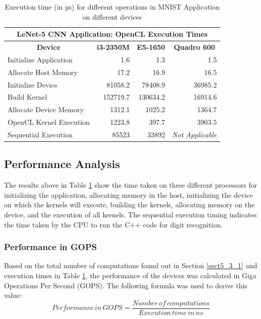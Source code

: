 \begin{table}[h!]
\centering
 \caption{Execution time (in µs) for different operations in MNIST Application on different devices}
 \vspace{3mm}
 \renewcommand\arraystretch{1.6}
 \begin{tabular}{ | m{12em} | r | r | r |  }
 \hline
 \multicolumn{4}{|c|}{LeNet-5 CNN Application: OpenCL Execution Times} \\
 \hline
 \multicolumn{1}{|c|}{\bfseries Device} & \multicolumn{1}{c|}{\bfseries i3-2350M} & \multicolumn{1}{c|}{\bfseries E5-1650} & \multicolumn{1}{c|}{\bfseries Quadro 600} \\
 \hline
 Initialize Application & 1.6 & 1.3 & 1.5 \\
 \hline
 Allocate Host Memory & 17.2 & 16.9 & 16.5 \\
 \hline
 Initialize Device & 81058.2 & 78408.9 & 36985.2 \\ 
 \hline
 Build Kernel & 152719.7  & 130634.2 & 16914.6 \\
 \hline
 Allocate Device Memory & 1312.1  & 1025.2 & 1364.7 \\
 \hline
 OpenCL Kernel Execution &1223.8 &  397.7 & 3903.5 \\
 \hline
 Sequential Execution & 85523 &  33892 & \textit{Not Applicable} \\
 \hline
 \end{tabular}
 \label{table:mnist_timings}
\end{table}

\subsection{Performance Analysis}
\label{sect5_3_3}
The results above in Table \ref{table:mnist_timings} show the time taken on three different processors for initializing the application, allocating memory in the host, initializing the device on which the kernels will execute, building the kernels, allocating memory on the device, and the execution of all kernels. The sequential execution timing indicates the time taken by the CPU to run the C++ code for digit recognition.

\subsubsection*{Performance in GOPS}
\label{sect5_3_3_a}
Based on the total number of computations found out in Section \ref{sect5_3_1} and execution times in Table \ref{table:mnist_timings}, the performance of the devices was calculated in Giga Operations Per Second (\ac{GOPS}). The following formula was used to derive this value:
\[Performance \, in \, GOPS=\frac{Number \, of \, computations}{Execution \, time \, in \, ns}\]


